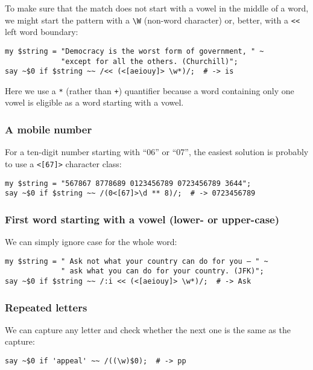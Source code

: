 To make sure that the match does not start with a vowel in 
the middle of a word, we might start the pattern with a 
\verb'\W' (non-word character) or, better, with a \verb'<<' 
left word boundary:

\begin{verbatim}
my $string = "Democracy is the worst form of government, " ~
             "except for all the others. (Churchill)";
say ~$0 if $string ~~ /<< (<[aeiouy]> \w*)/;  # -> is
\end{verbatim}

Here we use a \verb'*' (rather than \verb'+') quantifier 
because a word containing only one vowel is eligible as 
a word starting with a vowel.

\subsubsection{A mobile number}

For a ten-digit number starting with ``06'' or ``07'', the 
easiest solution is probably to use a \verb'<[67]>' character 
class:

\begin{verbatim}
my $string = "567867 8778689 0123456789 0723456789 3644";
say ~$0 if $string ~~ /(0<[67]>\d ** 8)/;  # -> 0723456789
\end{verbatim}

\subsubsection{First word starting with a vowel (lower- or upper-case)}

We can simply ignore case for the whole word:
\begin{verbatim}
my $string = " Ask not what your country can do for you — " ~
             " ask what you can do for your country. (JFK)";
say ~$0 if $string ~~ /:i << (<[aeiouy]> \w*)/;  # -> Ask
\end{verbatim}

\subsubsection{Repeated letters}

We can capture any letter and check whether the next one is 
the same as the capture:

\begin{verbatim}
say ~$0 if 'appeal' ~~ /((\w)$0);  # -> pp
\end{verbatim}

